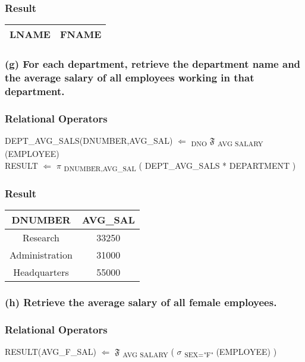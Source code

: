 \subsubsection*{Result}
\begin{center}
\begin{tabular}{ c | c }
  LNAME & FNAME \\ \hline
\end{tabular}
\end{center}

\subsubsection*{(g) For each department, retrieve the department name and the average salary of all employees working in that department.}
\subsubsection*{Relational Operators}
DEPT\_AVG\_SALS(DNUMBER,AVG\_SAL) $\Leftarrow$ \textsubscript{DNO} $\mathfrak{F}$ \textsubscript{AVG SALARY} (EMPLOYEE)\\
RESULT $\Leftarrow$ $\pi$ \textsubscript{DNUMBER,AVG\_SAL} ( DEPT\_AVG\_SALS * DEPARTMENT )

\subsubsection*{Result}
\begin{center}
\begin{tabular}{ c | c }
  DNUMBER & AVG\_SAL  \\ \hline
  Research & 33250 \\
  Administration & 31000 \\
  Headquarters & 55000 \\
\end{tabular}
\end{center}

\subsubsection*{(h) Retrieve the average salary of all female employees.}
\subsubsection*{Relational Operators}
RESULT(AVG\_F\_SAL) $\Leftarrow$ $\mathfrak{F}$ \textsubscript{AVG SALARY} ( $\sigma$ \textsubscript{SEX="F"} (EMPLOYEE) )

